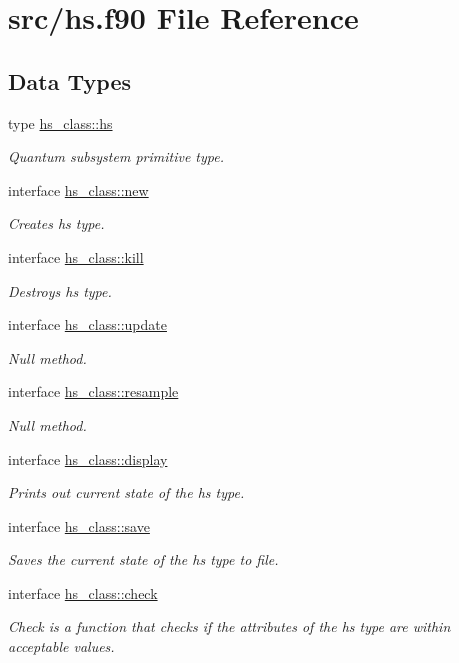 \hypertarget{hs_8f90}{}\section{src/hs.f90 File Reference}
\label{hs_8f90}
\subsection*{Data Types}
\begin{DoxyCompactItemize}
\item 
type \hyperlink{strucths__class_1_1hs}{hs\+\_\+class\+::hs}
\begin{DoxyCompactList}\small\item\em Quantum subsystem primitive type. \end{DoxyCompactList}\item 
interface \hyperlink{interfacehs__class_1_1new}{hs\+\_\+class\+::new}
\begin{DoxyCompactList}\small\item\em Creates hs type. \end{DoxyCompactList}\item 
interface \hyperlink{interfacehs__class_1_1kill}{hs\+\_\+class\+::kill}
\begin{DoxyCompactList}\small\item\em Destroys hs type. \end{DoxyCompactList}\item 
interface \hyperlink{interfacehs__class_1_1update}{hs\+\_\+class\+::update}
\begin{DoxyCompactList}\small\item\em Null method. \end{DoxyCompactList}\item 
interface \hyperlink{interfacehs__class_1_1resample}{hs\+\_\+class\+::resample}
\begin{DoxyCompactList}\small\item\em Null method. \end{DoxyCompactList}\item 
interface \hyperlink{interfacehs__class_1_1display}{hs\+\_\+class\+::display}
\begin{DoxyCompactList}\small\item\em Prints out current state of the hs type. \end{DoxyCompactList}\item 
interface \hyperlink{interfacehs__class_1_1save}{hs\+\_\+class\+::save}
\begin{DoxyCompactList}\small\item\em Saves the current state of the hs type to file. \end{DoxyCompactList}\item 
interface \hyperlink{interfacehs__class_1_1check}{hs\+\_\+class\+::check}
\begin{DoxyCompactList}\small\item\em Check is a function that checks if the attributes of the hs type are within acceptable values. \end{DoxyCompactList}\end{DoxyCompactItemize}
